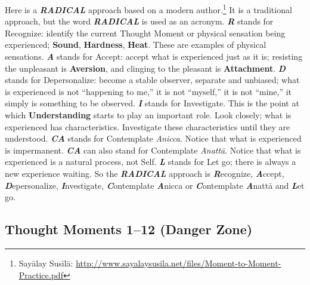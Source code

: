Here is a \textbf{\textit{RADICAL}} approach based on a modern author.\footnote{Sayālay Susīlā: \url{http://www.sayalaysusila.net/files/Moment-to-Moment-Practice.pdf}} It is a traditional approach, but the word \textbf{\textit{RADICAL}} is used as an acronym. \textbf{\textit{R}} stands for Recognize: identify the current Thought Moment or physical sensation being experienced; \textbf{Sound}, \textbf{Hardness}, \textbf{Heat}. These are examples of physical sensations. \textbf{\textit{A}} stands for Accept: accept what is experienced just as it is; resisting the unpleasant is \textbf{Aversion}, and clinging to the pleasant is \textbf{Attachment}. \textbf{\textit{D}} stands for Depersonalize: become a stable observer, separate and unbiased; what is experienced is not “happening to me,” it is not “myself,” it is not “mine,” it simply is something to be observed. \textbf{\textit{I}} stands for Investigate. This is the point at which \textbf{Understanding} starts to play an important role. Look closely; what is experienced has characteristics. Investigate these characteristics until they are understood. \textbf{\textit{CA}} stands for Contemplate \textit{Anicca}. Notice that what is experienced is impermanent. \textbf{\textit{CA}} can also stand for Contemplate \textit{Anattā}. Notice that what is experienced is a natural process, not Self. \textbf{\textit{L}} stands for Let go; there is always a new experience waiting. So the \textbf{\textit{RADICAL}} approach is \textbf{\textit{R}}ecognize, \textbf{\textit{A}}ccept, \textbf{\textit{D}}epersonalize, \textbf{\textit{I}}nvestigate, \textbf{\textit{C}}ontemplate \textbf{\textit{A}}nicca or \textbf{\textit{C}}ontemplate \textbf{\textit{A}}nattā and \textbf{\textit{L}}et go.

\pagebreak

\subsection*{Thought Moments 1--12 (Danger Zone)}

